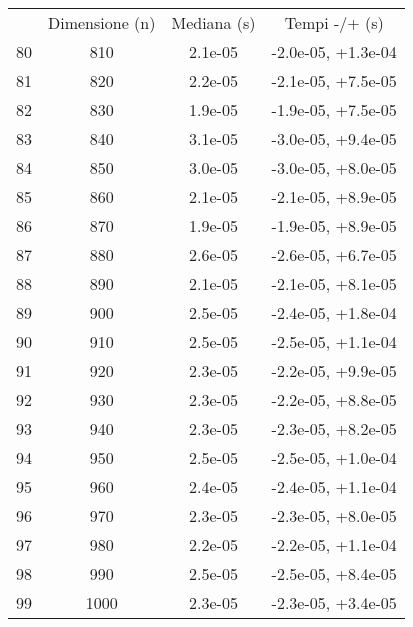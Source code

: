 \begin{table}
\centering
\begin{adjustbox}{width=1\textwidth/2}
\begin{tabular}{|c|c|c|c|}
\hline
 & Dimensione (n) & Mediana (s) & Tempi -/+ (s) \\
80 & 810 & 2.1e-05 & -2.0e-05, +1.3e-04 \\
\cline{1-4}
81 & 820 & 2.2e-05 & -2.1e-05, +7.5e-05 \\
\cline{1-4}
82 & 830 & 1.9e-05 & -1.9e-05, +7.5e-05 \\
\cline{1-4}
83 & 840 & 3.1e-05 & -3.0e-05, +9.4e-05 \\
\cline{1-4}
84 & 850 & 3.0e-05 & -3.0e-05, +8.0e-05 \\
\cline{1-4}
85 & 860 & 2.1e-05 & -2.1e-05, +8.9e-05 \\
\cline{1-4}
86 & 870 & 1.9e-05 & -1.9e-05, +8.9e-05 \\
\cline{1-4}
87 & 880 & 2.6e-05 & -2.6e-05, +6.7e-05 \\
\cline{1-4}
88 & 890 & 2.1e-05 & -2.1e-05, +8.1e-05 \\
\cline{1-4}
89 & 900 & 2.5e-05 & -2.4e-05, +1.8e-04 \\
\cline{1-4}
90 & 910 & 2.5e-05 & -2.5e-05, +1.1e-04 \\
\cline{1-4}
91 & 920 & 2.3e-05 & -2.2e-05, +9.9e-05 \\
\cline{1-4}
92 & 930 & 2.3e-05 & -2.2e-05, +8.8e-05 \\
\cline{1-4}
93 & 940 & 2.3e-05 & -2.3e-05, +8.2e-05 \\
\cline{1-4}
94 & 950 & 2.5e-05 & -2.5e-05, +1.0e-04 \\
\cline{1-4}
95 & 960 & 2.4e-05 & -2.4e-05, +1.1e-04 \\
\cline{1-4}
96 & 970 & 2.3e-05 & -2.3e-05, +8.0e-05 \\
\cline{1-4}
97 & 980 & 2.2e-05 & -2.2e-05, +1.1e-04 \\
\cline{1-4}
98 & 990 & 2.5e-05 & -2.5e-05, +8.4e-05 \\
\cline{1-4}
99 & 1000 & 2.3e-05 & -2.3e-05, +3.4e-05 \\
\cline{1-4}
\end{tabular}
\end{adjustbox}
\end{table}

